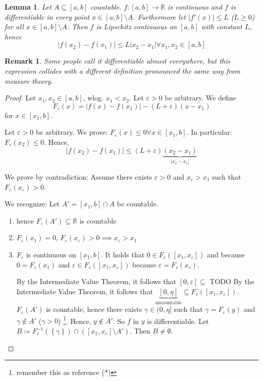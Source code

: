 \documentclass{article}
\newtheorem{lemma}{Lemma}  \numberwithin{lemma}{section}
\newtheorem{remark}{Remark}  \numberwithin{remark}{section}
\newcommand{\set}[1]{\left\{#1\right\}}
\newcommand{\card}[1]{\left|#1\right|}
\begin{document}
\begin{lemma} %
  \label{lemma10}
  Let $A \subseteq [a,b]$ countable.
  $f: [a,b] \to \mathbb R$ is continuous and $f$ is differentiable in every point $x \in [a,b] \setminus A$.
  Furthermore let $\card{f'(x)} \leq L$ ($L \geq 0$) for all $x \in [a,b] \setminus A$.
  Then $f$ is Lipschitz continuous on $[a,b]$ with constant $L$, hence
  \[ \card{f(x_2) - f(x_1)} \leq L \card{x_2 - x_1} \forall x_1, x_2 \in [a,b] \]
\end{lemma}
\begin{remark}
  Some people call it \emph{differentiable almost everywhere},
  but this expression collides with a different definition
  pronounced the same way from measure theory.
\end{remark}
\begin{proof}
  Let $x_1, x_2 \in [a,b]$, wlog. $x_1 < x_2$.
  Let $\varepsilon > 0$ be arbitrary. We define
  \[ F_{\varepsilon}(x) = \card{f(x) - f(x_1)} - (L + \varepsilon)(x - x_1) \]
  for $x \in [x_1, b]$.

  Let $\varepsilon > 0$ be arbitrary.
  We prove: $F_{\varepsilon}(x) \leq 0 \forall x \in [x_1, b]$. In particular: $F_{\varepsilon}(x_2) \leq 0$.
  Hence,
  \[ \card{f(x_2) - f(x_1)} \leq (L + \varepsilon)\underbrace{(x_2 - x_1)}_{\card{x_2 - x_1}} \]

  We prove by contradiction:
  Assume there exists $\varepsilon > 0$ and $x_{\varepsilon} > x_1$
  such that $F_{\varepsilon}(x_{\varepsilon}) > 0$.

  We recognize:
  Let $A' = [x_1, b] \cap A$ be countable.
  \begin{enumerate}
    \item hence $F_{\varepsilon}(A') \subseteq \mathbb R$ is countable
    \item $F_{\varepsilon}(x_1) = 0$, $F_{\varepsilon}(x_{\varepsilon}) > 0 \implies x_{\varepsilon} > x_1$
    \item $F_{\varepsilon}$ is continuous on $[x_1, b]$.
      It holds that $0 \in F_{\varepsilon}([x_1, x_{\varepsilon}])$ and because $0 = F_{\varepsilon}(x_1)$
      and $\varepsilon \in F_{\varepsilon}([x_1, x_{\varepsilon}])$ because $\varepsilon = F_{\varepsilon}(x_{\varepsilon})$.

      By the Intermediate Value Theorem, it follows that $[0, \varepsilon] \subseteq $ TODO
      By the Intermediate Value Theorem, it follows that $\underbrace{[0, \eta]}_{\text{uncountable}} \subseteq F_{\varepsilon}([x_1, x_{\varepsilon}])$.
      $F_{\varepsilon}(A')$ is countable, hence there exists $\gamma \in (0, \eta]$ such that $\gamma = F_{\varepsilon}(y)$ and $\gamma \not\in A'$ ($\gamma > 0$) \footnote{remember this as reference (*)}.
      Hence, $y \not\in A'$. So $f$ in $y$ is differentiable.
      Let $B \coloneqq F_{\varepsilon}^{-1}(\set{\gamma}) \cap \left([x_1, x_{\varepsilon}] \setminus A'\right)$.
      Then $B \neq \emptyset$.


\end{enumerate}
\end{proof}
\end{document}
